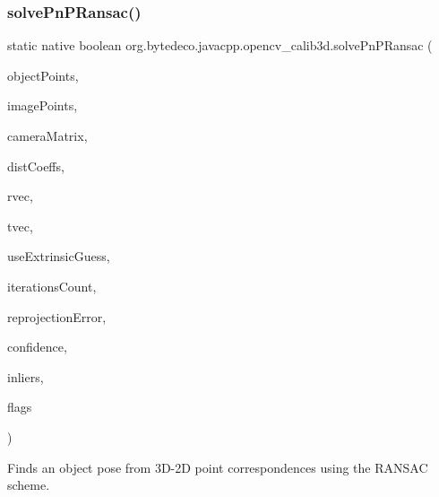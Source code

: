 \subsubsection{\texorpdfstring{solve\+Pn\+P\+Ransac()}{solvePnPRansac()}}
{\footnotesize\ttfamily static native boolean org.\+bytedeco.\+javacpp.\+opencv\+\_\+calib3d.\+solve\+Pn\+P\+Ransac (\begin{DoxyParamCaption}\item[{@By\+Val Mat}]{object\+Points,  }\item[{@By\+Val Mat}]{image\+Points,  }\item[{@By\+Val Mat}]{camera\+Matrix,  }\item[{@By\+Val Mat}]{dist\+Coeffs,  }\item[{@By\+Val Mat}]{rvec,  }\item[{@By\+Val Mat}]{tvec,  }\item[{@Cast(\char`\"{}bool\char`\"{}) boolean}]{use\+Extrinsic\+Guess,  }\item[{int}]{iterations\+Count,  }\item[{float}]{reprojection\+Error,  }\item[{double}]{confidence,  }\item[{@By\+Val(null\+Value=\char`\"{}cv\+::\+Output\+Array(cv\+::no\+Array())\char`\"{}) Mat}]{inliers,  }\item[{int}]{flags }\end{DoxyParamCaption})\hspace{0.3cm}{\ttfamily [static]}}



Finds an object pose from 3\+D-\/2D point correspondences using the R\+A\+N\+S\+AC scheme. 


